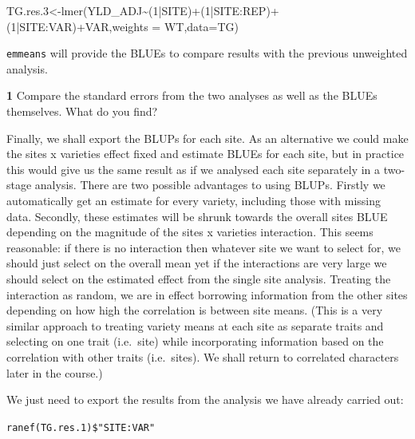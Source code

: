 \documentclass[
]{book}
\makeatletter
\newenvironment{Shaded}{\begin{snugshade}}{\end{snugshade}}
\newcommand{\AttributeTok}[1]{\textcolor[rgb]{0.77,0.63,0.00}{#1}}
\newcommand{\DecValTok}[1]{\textcolor[rgb]{0.00,0.00,0.81}{#1}}
\newcommand{\FloatTok}[1]{\textcolor[rgb]{0.00,0.00,0.81}{#1}}
\newcommand{\FunctionTok}[1]{\textcolor[rgb]{0.00,0.00,0.00}{#1}}
\newcommand{\NormalTok}[1]{#1}
\newcommand{\OtherTok}[1]{\textcolor[rgb]{0.56,0.35,0.01}{#1}}
\newcommand{\SpecialCharTok}[1]{\textcolor[rgb]{0.00,0.00,0.00}{#1}}
\newenvironment{kframe}{%
\medskip{}
\setlength{\fboxsep}{.8em}
 \def\at@end@of@kframe{}%
 \ifinner\ifhmode%
  \def\at@end@of@kframe{\end{minipage}}%
  \begin{minipage}{\columnwidth}%
 \fi\fi%
 \def\FrameCommand##1{\hskip\@totalleftmargin \hskip-\fboxsep
 \colorbox{shadecolor}{##1}\hskip-\fboxsep
     \hskip-\linewidth \hskip-\@totalleftmargin \hskip\columnwidth}%
 \MakeFramed {\advance\hsize-\width
   \@totalleftmargin\z@ \linewidth\hsize
   \@setminipage}}%
 {\par\unskip\endMakeFramed%
 \at@end@of@kframe}
\newenvironment{rmdblock}[1]
  {
  \begin{itemize}
  \renewcommand{\labelitemi}{
    \raisebox{-.7\height}[0pt][0pt]{
      {\setkeys{Gin}{width=3em,keepaspectratio}\texttt{[image: images/\#1]}}
    }
  }
  \setlength{\fboxsep}{1em}
  \begin{kframe}
  \item
  }
  {
  \end{kframe}
  \end{itemize}
  }
\newenvironment{rmdquiz}
  {\begin{rmdblock}{quiz}}
  {\end{rmdblock}}
\makeatother
\begin{document}
\begin{Shaded}
\begin{Highlighting}[]
\NormalTok{TG.res}\FloatTok{.3}\OtherTok{\textless{}{-}}\FunctionTok{lmer}\NormalTok{(YLD\_ADJ}\SpecialCharTok{\textasciitilde{}}\NormalTok{(}\DecValTok{1}\SpecialCharTok{|}\NormalTok{SITE)}\SpecialCharTok{+}\NormalTok{(}\DecValTok{1}\SpecialCharTok{|}\NormalTok{SITE}\SpecialCharTok{:}\NormalTok{REP)}\SpecialCharTok{+}\NormalTok{(}\DecValTok{1}\SpecialCharTok{|}\NormalTok{SITE}\SpecialCharTok{:}\NormalTok{VAR)}\SpecialCharTok{+}\NormalTok{VAR,}\AttributeTok{weights =}\NormalTok{ WT,}\AttributeTok{data=}\NormalTok{TG)}
\end{Highlighting}
\end{Shaded}

\texttt{emmeans} will provide the BLUEs to compare results with the previous unweighted analysis.

\begin{rmdquiz}
\textbf{1} Compare the standard errors from the two analyses as well as the BLUEs themselves. What do you find?
\end{rmdquiz}

Finally, we shall export the BLUPs for each site. As an alternative we could make the sites x varieties effect fixed and estimate BLUEs for each site, but in practice this would give us the same result as if we analysed each site separately in a two-stage analysis. There are two possible advantages to using BLUPs. Firstly we automatically get an estimate for every variety, including those with missing data. Secondly, these estimates will be shrunk towards the overall sites BLUE depending on the magnitude of the sites x varieties interaction. This seems reasonable: if there is no interaction then whatever site we want to select for, we should just select on the overall mean yet if the interactions are very large we should select on the estimated effect from the single site analysis. Treating the interaction as random, we are in effect borrowing information from the other sites depending on how high the correlation is between site means. (This is a very similar approach to treating variety means at each site as separate traits and selecting on one trait (i.e.~site) while incorporating information based on the correlation with other traits (i.e.~sites). We shall return to correlated characters later in the course.)

We just need to export the results from the analysis we have already carried out:

\texttt{ranef(TG.res.1)\$"SITE:VAR"}
\end{document}
